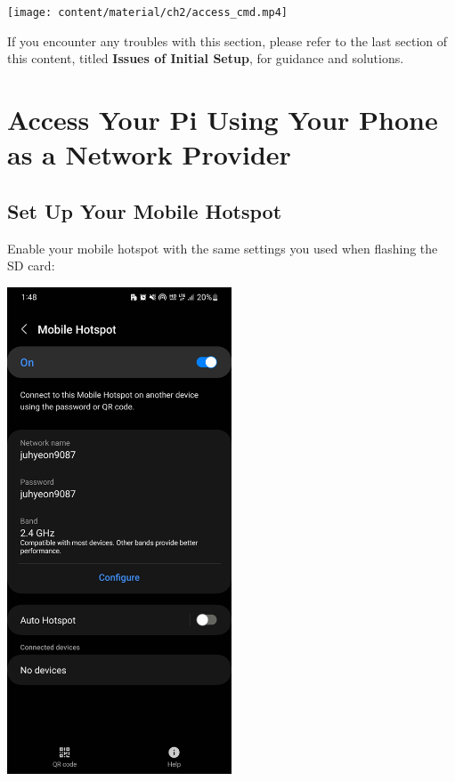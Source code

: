 \documentclass[
  letterpaper,
]{scrbook}
\begin{document}
\texttt{[image: content/material/ch2/access\_cmd.mp4]}

\begin{tcolorbox}[enhanced jigsaw, bottomrule=.15mm, opacitybacktitle=0.6, toprule=.15mm, colback=white, colbacktitle=quarto-callout-note-color!10!white, left=2mm, colframe=quarto-callout-note-color-frame, coltitle=black, title=\textcolor{quarto-callout-note-color}{\faInfo}\hspace{0.5em}{Note}, opacityback=0, breakable, bottomtitle=1mm, toptitle=1mm, titlerule=0mm, arc=.35mm, leftrule=.75mm, rightrule=.15mm]

If you encounter any troubles with this section, please refer to the
last section of this content, titled \textbf{Issues of Initial Setup},
for guidance and solutions.

\end{tcolorbox}

\hypertarget{sec-way2}{%
\section{Access Your Pi Using Your Phone as a Network
Provider}\label{sec-way2}}

\hypertarget{set-up-your-mobile-hotspot}{%
\subsection{Set Up Your Mobile
Hotspot}\label{set-up-your-mobile-hotspot}}

Enable your mobile hotspot with the same settings you used when flashing
the SD card:

\includegraphics[width=0.5\textwidth,height=\textheight]{content/material/ch2/hotspot_default.jpg}
\end{document}
